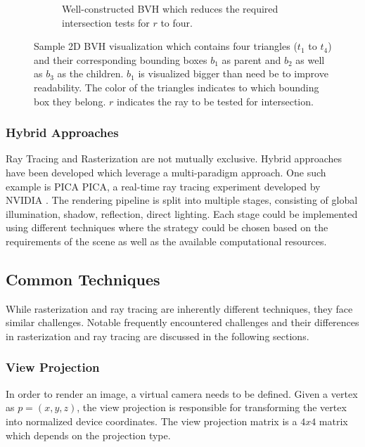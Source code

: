 \begin{figure}[H]
\begin{subfigure}[b]{0.45\textwidth}
    \caption{Well-constructed \gls{BVH} which reduces the required intersection tests for $r$ to four.}
    \label{fig:bvhGood}
  \end{subfigure}
  \caption{Sample 2D \gls{BVH} visualization which contains four triangles ($t_1$ to $t_4$) and their corresponding bounding boxes $b_1$ as parent and $b_2$ as well as $b_3$ as the children. $b_1$ is visualized bigger than need be to improve readability. The color of the triangles indicates to which bounding box they belong. $r$ indicates the ray to be tested for intersection.}
  \label{fig:bvhVisualized}
\end{figure}

\subsubsection{Hybrid Approaches}

Ray Tracing and Rasterization are not mutually exclusive. Hybrid approaches have been developed which leverage a multi-paradigm approach. One such example is PICA PICA, a real-time ray tracing experiment developed by NVIDIA \cite{hybridRenderingBarreBrisebois2019}. The rendering pipeline is split into multiple stages, consisting of global illumination, shadow, reflection, direct lighting. Each stage could be implemented using different techniques where the strategy could be chosen based on the requirements of the scene as well as the available computational resources.

\subsection{Common Techniques}

While rasterization and ray tracing are inherently different techniques, they face similar challenges. Notable frequently encountered challenges and their differences in rasterization and ray tracing are discussed in the following sections.

\subsubsection{View Projection}
\label{sec:viewProjection}

In order to render an image, a virtual camera needs to be defined. Given a vertex as $p = (x, y, z)$, the view projection is responsible for transforming the vertex into normalized device coordinates. The view projection matrix is a $4x4$ matrix which depends on the projection type.

